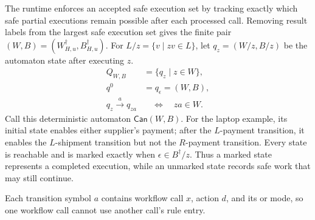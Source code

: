 The runtime enforces an accepted safe execution set by tracking exactly which safe partial executions remain possible after each processed call.
Removing result labels from the largest safe execution set gives the finite pair \((W,B)=(W^\dagger_{H,u},B^\dagger_{H,u})\).
For \(L/z=\{v\mid zv\in L\}\), let \(q_z=(W/z,B/z)\) be the automaton state after executing \(z\).
\begin{equation}
\label{eq:canonical-automaton}
\begin{aligned}
 Q_{W,B} &= \{q_z\mid z\in W\},\\
 q^0&=q_\epsilon=(W,B),\\
 q_z\xrightarrow{a}q_{za}
 &\quad\Longleftrightarrow\quad za\in W .
\end{aligned}
\end{equation}
Call this deterministic automaton \(\mathsf{Can}(W,B)\).
For the laptop example, its initial state enables either supplier's payment; after the \(L\)-payment transition, it enables the \(L\)-shipment transition but not the \(R\)-payment transition.
Every state is reachable and is marked exactly when \(\epsilon\in B^\dagger/z\).
Thus a marked state represents a completed execution, while an unmarked state records safe work that may still continue.

Each transition symbol \(a\) contains workflow call \(x\), action \(d\), and its \Fresh or \Alias mode, so one workflow call cannot use another call's rule entry.

